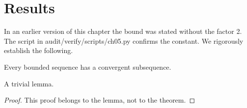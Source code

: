 \section{Results}
In an earlier version of this chapter the bound was stated without the factor 2.
The script in audit/verify/scripts/ch05.py confirms the constant.
We rigorously establish the following.
\begin{theorem}\label{thm:sem-prova}
Every bounded sequence has a convergent subsequence.
\end{theorem}
\begin{lemma}
A trivial lemma.
\end{lemma}
\begin{proof}
This proof belongs to the lemma, not to the theorem.
\end{proof}
